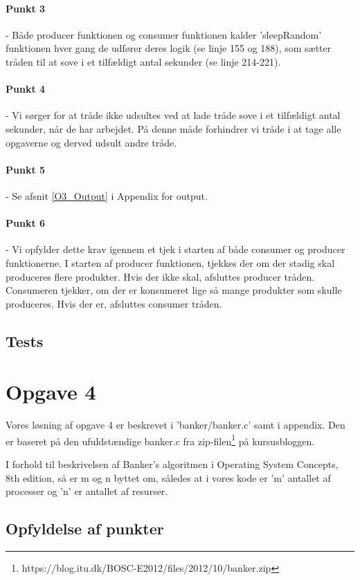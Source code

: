 \paragraph{Punkt 3} - Både producer funktionen og consumer funktionen kalder 'sleepRandom' funktionen hver gang de udfører deres logik (se linje 155 og 188), som sætter tråden til at sove i et tilfældigt antal sekunder (se linje 214-221).
\paragraph{Punkt 4} - Vi sørger for at tråde ikke udsultes ved at lade tråde sove i et tilfældigt antal sekunder, når de har arbejdet. På denne måde forhindrer vi tråde i at tage alle opgaverne og derved udsult andre tråde.
\paragraph{Punkt 5} - Se afsnit \ref{O3_Output} i Appendix for output.
\paragraph{Punkt 6} - Vi opfylder dette krav igennem et tjek i starten af både consumer og producer funktionerne. I starten af producer funktionen, tjekkes der om der stadig skal produceres flere produkter. Hvis der ikke skal, afsluttes producer tråden. Consumeren tjekker, om der er konsumeret lige så mange produkter som skulle produceres. Hvis der er, afsluttes consumer tråden.
\subsection{Tests}
\label{O3_Tests}

\section{Opgave 4}
\label{O4}
Vores løsning af opgave 4 er beskrevet i 'banker/banker.c' samt i appendix. Den er baseret på den ufuldstændige banker.c fra zip-filen\footnote{https://blog.itu.dk/BOSC-E2012/files/2012/10/banker.zip} på kursusbloggen.

I forhold til beskrivelsen af Banker's algoritmen i Operating System Concepts, 8th edition, så er m og n byttet om, således at i vores kode er 'm' antallet af processer og 'n' er antallet af resurser.

\subsection{Opfyldelse af punkter}
\label{O4_Punkter}

